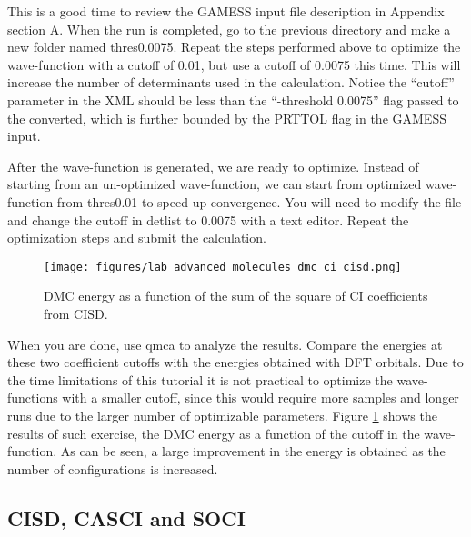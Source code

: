 This is a good time to review the GAMESS input file description in Appendix section A. 
When the run is completed, go to the previous directory and make a new folder named
thres0.0075. Repeat the steps performed above to optimize the wave-function with a cutoff of 0.01, but use a cutoff of 0.0075 this time. This will increase the number of determinants used in the calculation. Notice the ``cutoff'' parameter in the XML should be less than the ``-threshold 0.0075'' flag passed to the converted, which is further bounded by the PRTTOL flag in the GAMESS input.

After the wave-function is generated, we are ready to optimize. Instead of starting from an un-optimized wave-function, we can start from optimized wave-function from thres0.01 to speed up convergence. You will need to modify the file and change the cutoff in detlist to 0.0075 with a text editor. Repeat the optimization steps and submit the calculation.

\begin{figure}
\begin{center}
\texttt{[image: figures/lab\_advanced\_molecules\_dmc\_ci\_cisd.png]}
\end{center}
\caption{DMC energy as a function of the sum of the square of CI coefficients from CISD.
\label{fig:lam_dmc_ci_cisd}
}
\end{figure}

When you are done, use qmca to analyze the results. Compare the energies at these two
coefficient cutoffs with the energies obtained with DFT orbitals. Due to the time limitations of this tutorial it is not practical to optimize the wave-functions with a smaller cutoff, since this would require more samples and longer runs due to the larger number of optimizable parameters. Figure \ref{fig:lam_dmc_ci_cisd} shows the results of such exercise, the DMC energy as a function of the cutoff in the wave-function. As can be seen, a large improvement in the energy is obtained as the number of configurations is increased.



\subsection{CISD, CASCI and SOCI}

